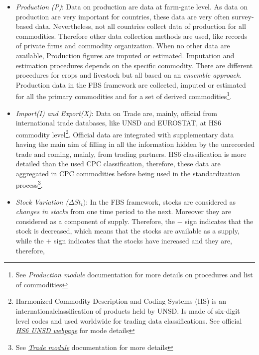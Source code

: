 \documentclass[]{article}
\let\rmarkdownfootnote\footnote%
\def\footnote{\protect\rmarkdownfootnote}
\begin{document}
\begin{itemize}
\item
  \emph{Production (P)}: Data on production are data at farm-gate level.
  As data on production are very important for countries, these data are
  very often survey-based data. Nevertheless, not all countries collect
  data of production for all commodities. Therefore other data
  collection methods are used, like records of private firms and
  commodity organization. When no other data are available, Production
  figures are imputed or estimated. Imputation and estimation procedures
  depends on the specific commodity. There are different procedures for
  crops and livestock but all based on an \emph{ensemble approach}.
  Production data in the FBS framework are collected, imputed or
  estimated for all the primary commodities and for a set of derived
  commodities\footnote{See \emph{Production module} documentation for
    more details on procedures and list of commodities}.
\item
  \emph{Import(I) and Export(X)}: Data on Trade are, mainly, official
  from international trade databases, like UNSD and EUROSTAT, at HS6
  commodity level\footnote{Harmonized Commodity Description and Coding
    Systems (HS) is an internationalclassification of products held by
    UNSD. Is made of six-digit level codes and used worldwide for
    trading data classifications. See official
    \href{https://unstats.un.org/unsd/tradekb/Knowledgebase/50018/Harmonized-Commodity-Description-and-Coding-Systems-HS}{\emph{HS6
    UNSD webpage}} for mode details}. Official data are integrated with
  supplementary data having the main aim of filling in all the
  information hidden by the unrecorded trade and coming, mainly, from
  trading partners. HS6 classification is more detailed than the used
  CPC classification, therefore, these data are aggregated in CPC
  commodities before being used in the standardization process\footnote{See
    \href{https://github.com/SWS-Methodology/faoswsTrade/blob/master/vignettes/Documentation/tradeDocumentation.pdf}{\emph{Trade
    module}} documentation for more details}.
\item
  \emph{Stock Variation (}\(\Delta St_{t})\): In the FBS framework,
  stocks are considered as \emph{changes in stocks} from one time period
  to the next. Moreover they are considered as a component of supply.
  Therefore, the \(-\) sign indicates that the stock is decreased, which
  means that the stocks are available as a supply, while the \(+\) sign
  indicates that the stocks have increased and they are, therefore,

\end{itemize}
\end{document}
